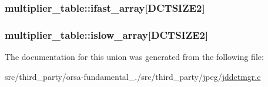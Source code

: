 \subsubsection[{ifast\+\_\+array}]{ multiplier\+\_\+table\+::ifast\+\_\+array\mbox{[}{\bf D\+C\+T\+S\+I\+Z\+E2}\mbox{]}}\label{unionmultiplier__table_a815932c92e5d7cea970c6cddb5bbf6f1}
\hypertarget{unionmultiplier__table_a8585c9759405a74e7cbd4d6b3f8da073}{}
\subsubsection[{islow\+\_\+array}]{ multiplier\+\_\+table\+::islow\+\_\+array\mbox{[}{\bf D\+C\+T\+S\+I\+Z\+E2}\mbox{]}}\label{unionmultiplier__table_a8585c9759405a74e7cbd4d6b3f8da073}


The documentation for this union was generated from the following file\+:\begin{DoxyCompactItemize}
\item 
src/third\+\_\+party/orsa-\/fundamental\+\_./src/third\+\_\+party/jpeg/\hyperlink{jddctmgr_8c}{jddctmgr.\+c}\end{DoxyCompactItemize}

